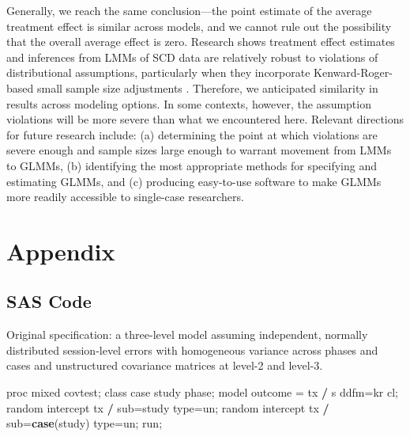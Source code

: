 \documentclass[
]{book}
\newenvironment{Shaded}{\begin{snugshade}}{\end{snugshade}}
\newcommand{\FunctionTok}[1]{\textcolor[rgb]{0.13,0.29,0.53}{\textbf{#1}}}
\newcommand{\NormalTok}[1]{#1}
\newcommand{\OtherTok}[1]{\textcolor[rgb]{0.56,0.35,0.01}{#1}}
\newcommand{\SpecialCharTok}[1]{\textcolor[rgb]{0.81,0.36,0.00}{\textbf{#1}}}
\begin{document}
Generally, we reach the same conclusion---the point estimate of the average treatment effect is similar across models, and we cannot rule out the possibility that the overall average effect is zero. Research shows treatment effect estimates and inferences from LMMs of SCD data are relatively robust to violations of distributional assumptions, particularly when they incorporate Kenward-Roger-based small sample size adjustments \citep{Joo_et_al_2019, Moeyaert_Ugille_Ferron_Beretvas_VandenNoortgate_2013, Owens_Ferron_2012}. Therefore, we anticipated similarity in results across modeling options. In some contexts, however, the assumption violations will be more severe than what we encountered here. Relevant directions for future research include: (a) determining the point at which violations are severe enough and sample sizes large enough to warrant movement from LMMs to GLMMs, (b) identifying the most appropriate methods for specifying and estimating GLMMs, and (c) producing easy-to-use software to make GLMMs more readily accessible to single-case researchers.

\hypertarget{appendix}{%
\section{Appendix}\label{appendix}}

\hypertarget{sas-code}{%
\subsection{SAS Code}\label{sas-code}}

Original specification: a three-level model assuming independent, normally distributed session-level errors with homogeneous variance across phases and cases and unstructured covariance matrices at level-2 and level-3.

\begin{Shaded}
\begin{Highlighting}[]
\NormalTok{proc mixed covtest;}
\NormalTok{class case study phase;}
\NormalTok{model outcome }\OtherTok{=}\NormalTok{ tx }\SpecialCharTok{/}\NormalTok{ s ddfm}\OtherTok{=}\NormalTok{kr cl;}
\NormalTok{random intercept tx }\SpecialCharTok{/}\NormalTok{ sub}\OtherTok{=}\NormalTok{study type}\OtherTok{=}\NormalTok{un;}
\NormalTok{random intercept tx }\SpecialCharTok{/}\NormalTok{ sub}\OtherTok{=}\FunctionTok{case}\NormalTok{(study) type}\OtherTok{=}\NormalTok{un;}
\NormalTok{run;}
\end{Highlighting}
\end{Shaded}
\end{document}
